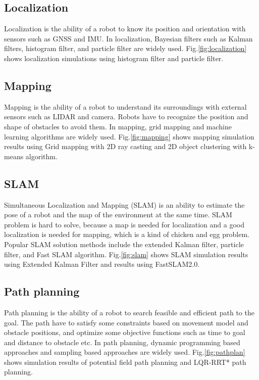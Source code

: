 \documentclass{bmvc2k}
\begin{document}
\subsection{Localization}

Localization is the ability of a robot to know its position and orientation with sensors such as GNSS and IMU.
In localization, Bayesian filters such as Kalman filters, histogram filter, and particle filter are widely used\cite{PR}.
Fig.\ref{fig:localization} shows localization simulations using histogram filter and particle filter.



\subsection{Mapping}
Mapping is the ability of a robot to understand its surroundings with external sensors such as LIDAR and camera.
Robots have to recognize the position and shape of obstacles to avoid them.
In mapping, grid mapping and machine learning algorithms are widely used\cite{PR}\cite{PRML}.
Fig.\ref{fig:mapping} shows mapping simulation results using Grid mapping with 2D ray casting and 2D object clustering with k-means algorithm.



\subsection{SLAM}
Simultaneous Localization and Mapping (SLAM) is an ability to estimate the pose of a robot and the map of the environment at the same time.
SLAM problem is hard to solve, because a map is needed for localization and a good localization is needed for mapping, which is a kind of chicken and egg problem.
Popular SLAM solution methods include the extended Kalman filter, particle filter, and Fast SLAM algorithm\cite{PR}.
Fig.\ref{fig:slam} shows SLAM simulation results using Extended Kalman Filter and results using FastSLAM2.0\cite{PR}.



\subsection{Path planning}

Path planning is the ability of a robot to search feasible and efficient path to the goal.
The path have to satisfy some constraints based on movement model and obstacle positions, and optimize some objective functions such as time to goal and distance to obstacle etc.
In path planning, dynamic programming based approaches and sampling based approaches are widely used\cite{pathplanning}.
Fig.\ref{fig:pathplan} shows simulation results of potential field path planning and LQR-RRT* path planning\cite{lqrrrt}.
\end{document}
